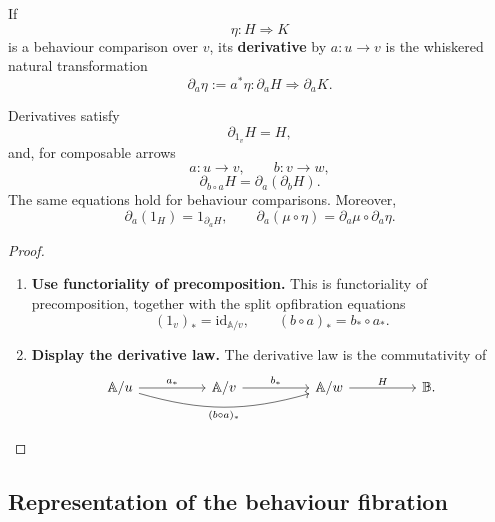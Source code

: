 \begin{definition}
\label{def:derivative-comparison}
    If
    \[
        \eta:H\Rightarrow K
    \]
    is a behaviour comparison over \(v\), its \textbf{derivative} by \(a:u\to v\) is the whiskered natural transformation
    \[
        \partial_a\eta:=a^*\eta:
        \partial_aH\Rightarrow\partial_aK.
    \]
\end{definition}

\begin{proposition}
\label{prop:derivative-laws-behaviour-category}
    Derivatives satisfy
    \[
        \partial_{1_v}H=H,
    \]
    and, for composable arrows
    \[
        a:u\to v,
        \qquad
        b:v\to w,
    \]
    \[
        \partial_{b\circ a}H
        =
        \partial_a(\partial_bH).
    \]
    The same equations hold for behaviour comparisons. Moreover,
    \[
        \partial_a(1_H)=1_{\partial_aH},
        \qquad
        \partial_a(\mu\circ\eta)=\partial_a\mu\circ\partial_a\eta.
    \]
\end{proposition}
\begin{proof}
    \leavevmode
    \begin{enumerate}
        \item \textbf{Use functoriality of precomposition.} This is functoriality of precomposition, together with the split opfibration equations
        \[
            (1_v)_*=\mathrm{id}_{\mathbb A/v},
            \qquad
            (b\circ a)_*=b_*\circ a_*.
        \]

        \item \textbf{Display the derivative law.} The derivative law is the commutativity of
        \[
            \begin{tikzcd}[column sep=huge, row sep=large]
                    \mathbb A/u
                        \arrow[r, "a_*"]
                        \arrow[rr, "{(b\circ a)_*}"', bend right=16]
                &
                    \mathbb A/v
                        \arrow[r, "b_*"]
                &
                    \mathbb A/w
                        \arrow[r, "H"]
                &
                    \mathbb B.
            \end{tikzcd}
        \]
    \end{enumerate}
\end{proof}

\subsection{Representation of the behaviour fibration}
\label{subsec:representation-behaviour-fibration}

